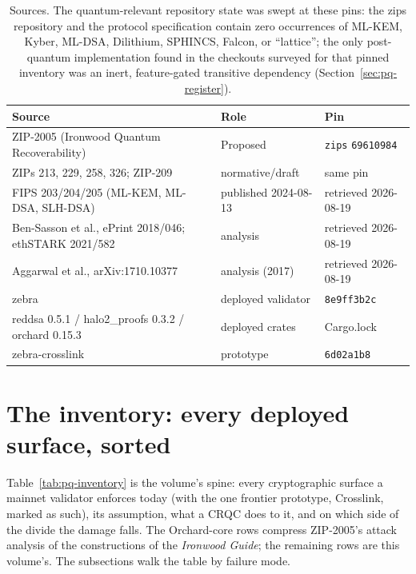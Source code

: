 \documentclass[11pt,a4paper]{article}
\theoremstyle{definition}
\begin{document}
\begin{table}[ht]
\centering
\small
\begin{tabular}{@{}lll@{}}
\toprule
Source & Role & Pin \\
\midrule
ZIP-2005 (Ironwood Quantum Recoverability) & Proposed & \texttt{zips} \texttt{69610984} \\
ZIPs 213, 229, 258, 326; ZIP-209 & normative/draft & same pin \\
FIPS 203/204/205 (ML-KEM, ML-DSA, SLH-DSA) & published 2024-08-13 & retrieved 2026-08-19 \\
Ben-Sasson et al., ePrint 2018/046; ethSTARK 2021/582 & analysis & retrieved 2026-08-19 \\
Aggarwal et al., arXiv:1710.10377 & analysis (2017) & retrieved 2026-08-19 \\
\textsf{zebra} & deployed validator & \texttt{8e9ff3b2c} \\
\textsf{reddsa} 0.5.1 / \textsf{halo2\_proofs} 0.3.2 / \textsf{orchard} 0.15.3 & deployed crates & Cargo.lock \\
\textsf{zebra-crosslink} & prototype & \texttt{6d02a1b8} \\
\bottomrule
\end{tabular}
\caption{Sources. The quantum-relevant repository state was swept at
these pins: the zips repository and the protocol specification contain
zero occurrences of ML-KEM, Kyber, ML-DSA, Dilithium, SPHINCS, Falcon,
or ``lattice''; the only post-quantum implementation found in the
checkouts surveyed for that pinned inventory was an inert,
feature-gated transitive dependency
(Section~\ref{sec:pq-register}).}
\label{tab:pq-sources}
\end{table}

\FloatBarrier

\section{The inventory: every deployed surface, sorted}\label{sec:pq-inventory}

Table~\ref{tab:pq-inventory} is the volume's spine: every cryptographic
surface a mainnet validator enforces today (with the one frontier
prototype, Crosslink, marked as such), its assumption, what a CRQC
does to it, and on which side of the divide the damage falls. The
Orchard-core rows compress ZIP-2005's attack analysis of the constructions
of the \emph{Ironwood Guide}; the remaining rows are this volume's. The
subsections walk the table by failure mode.
\end{document}
